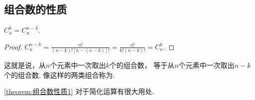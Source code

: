 

\subsection{组合数的性质}
\begin{property}\label{theorem:组合数性质1}
\(C_n^k = C_n^{n-k}\).
\begin{proof}
\(
C_n^{n-k}
= \frac{n!}{(n-k)! [n-(n-k)]!}
= \frac{n!}{k! (n-k)!}
= C_n^k
\).
\end{proof}
\end{property}
这就是说，从\(n\)个元素中一次取出\(k\)个的组合数，
等于从\(n\)个元素中一次取出\(n-k\)个的组合数.
像这样的两类组合称为.

\cref{theorem:组合数性质1} 对于简化运算有很大用处.

